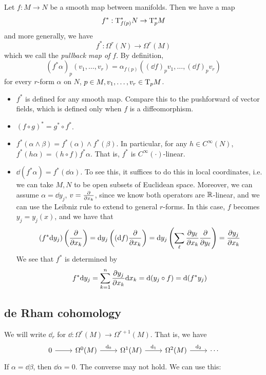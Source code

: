 \documentclass{article}
\begin{document}
\begin{definition}
    [pullback] Let \(f : M \to N\) be a smooth map between manifolds. Then we have a map
    \[f^* : \mathrm{T}^*_{f(p)}N \to \mathrm{T}^*_pM\]
    and more generally, we have
    \[f^* : \Omega^r(N) \to \Omega^r(M)\]
    which we call the \emph{pullback map of \(f\)}. By definition,
    \[(f^*\alpha)_p(v_1, \dots, v_r) = \alpha_{f(p)}((\dd f)_pv_1, \dots, (\dd f)_p v_r)\]
    for every \(r\)-form \(\alpha\) on \(N\), \(p \in M, v_1, \dots, v_r \in \mathrm{T}_pM\).
\end{definition}

\begin{remark}
    \begin{itemize}
        \item \(f^*\) is defined for any smooth map. Compare this to the pushforward of vector fields, which is defined only when \(f\) is a diffeomorphism.
        \item \((f \circ g)^* = g^* \circ f^*\).
        \item \(f^*(\alpha \wedge \beta) = f^*(\alpha) \wedge f^*(\beta)\). In particular, for any \(h \in C^\infty(N)\), \(f^*(h\alpha) = (h \circ f)f^*\alpha\). That is, \(f^*\) is \(C^\infty(\cdot)\)-linear.
        \item \(\dd(f^*\alpha) = f^*(\dd\alpha)\). To see this, it suffices to do this in local coordinates, i.e. we can take \(M, N\) to be open subsets of Euclidean space. Moreover, we can assume \(\alpha = \dd y_j\), \(v = \pdv{x_k}\), since we know both operators are \(\mathbb{R}\)-linear, and we can use the Leibniz rule to extend to general \(r\)-forms. In this case, \(f\) becomes \(y_j = y_j(x)\), and we have that
        \[(f^*\dd y_j)\left(\pdv{x_k}\right) = \dd y_j\left((\dd f)\pdv{x_k}\right) = \dd y_j\left(\sum_\ell\pdv{y_\ell}{x_k}\pdv{y_\ell}\right) = \pdv{y_j}{x_k}\]
        We see that \(f^*\) is determined by
        \[f^*\dd y_j = \sum_{k=1}^n \pdv{y_j}{x_k}\dd x_k = \dd(y_j \circ f) = \dd(f^*y_j)\]
    \end{itemize}
\end{remark}

\subsection{de Rham cohomology}

We will write \(\dd_r\) for \(\dd : \Omega^r(M) \to \Omega^{r+1}(M)\). That is, we have
\[\begin{tikzcd}
	0 & {\Omega^0(M)} & {\Omega^1(M)} & {\Omega^2(M)} & \cdots
	\arrow[from=1-1, to=1-2]
	\arrow["{\dd_0}", from=1-2, to=1-3]
	\arrow["{\dd_1}", from=1-3, to=1-4]
	\arrow["{\dd_2}", from=1-4, to=1-5]
\end{tikzcd}\]
If \(\alpha = \dd\beta\), then \(\dd\alpha = 0\). The converse may not hold. We can use this:
\end{document}
